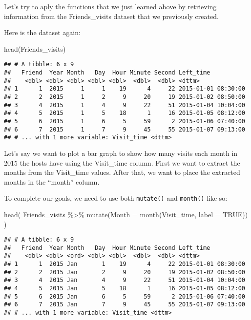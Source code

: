 \documentclass[
]{book}
\newenvironment{Shaded}{\begin{snugshade}}{\end{snugshade}}
\newcommand{\AttributeTok}[1]{\textcolor[rgb]{0.77,0.63,0.00}{#1}}
\newcommand{\ConstantTok}[1]{\textcolor[rgb]{0.00,0.00,0.00}{#1}}
\newcommand{\FunctionTok}[1]{\textcolor[rgb]{0.00,0.00,0.00}{#1}}
\newcommand{\NormalTok}[1]{#1}
\newcommand{\SpecialCharTok}[1]{\textcolor[rgb]{0.00,0.00,0.00}{#1}}
\begin{document}
Let's try to aply the functions that we just learned above by retrieving information from the Friends\_visits dataset that we previously created.

Here is the dataset again:

\begin{Shaded}
\begin{Highlighting}[]
\FunctionTok{head}\NormalTok{(Friends\_visits)}
\end{Highlighting}
\end{Shaded}

\begin{verbatim}
## # A tibble: 6 x 9
##   Friend  Year Month   Day  Hour Minute Second Left_time          
##    <dbl> <dbl> <dbl> <dbl> <dbl>  <dbl>  <dbl> <dttm>             
## 1      1  2015     1     1    19      4     22 2015-01-01 08:30:00
## 2      2  2015     1     2     9     20     19 2015-01-02 08:50:00
## 3      4  2015     1     4     9     22     51 2015-01-04 10:04:00
## 4      5  2015     1     5    18      1     16 2015-01-05 08:12:00
## 5      6  2015     1     6     5     59      2 2015-01-06 07:40:00
## 6      7  2015     1     7     9     45     55 2015-01-07 09:13:00
## # ... with 1 more variable: Visit_time <dttm>
\end{verbatim}

Let's say we want to plot a bar graph to show how many visits each month in 2015 the hosts have using the Visit\_time column. First we want to extract the months from the Visit\_time values. After that, we want to place the extracted months in the ``month'' column.

To complete our goals, we need to use both \texttt{mutate()} and \texttt{month()} like so:

\begin{Shaded}
\begin{Highlighting}[]
\FunctionTok{head}\NormalTok{(}
\NormalTok{Friends\_visits }\SpecialCharTok{\%\textgreater{}\%} 
    \FunctionTok{mutate}\NormalTok{(}\AttributeTok{Month =} \FunctionTok{month}\NormalTok{(Visit\_time, }\AttributeTok{label =} \ConstantTok{TRUE}\NormalTok{))}
\NormalTok{    )}
\end{Highlighting}
\end{Shaded}

\begin{verbatim}
## # A tibble: 6 x 9
##   Friend  Year Month   Day  Hour Minute Second Left_time          
##    <dbl> <dbl> <ord> <dbl> <dbl>  <dbl>  <dbl> <dttm>             
## 1      1  2015 Jan       1    19      4     22 2015-01-01 08:30:00
## 2      2  2015 Jan       2     9     20     19 2015-01-02 08:50:00
## 3      4  2015 Jan       4     9     22     51 2015-01-04 10:04:00
## 4      5  2015 Jan       5    18      1     16 2015-01-05 08:12:00
## 5      6  2015 Jan       6     5     59      2 2015-01-06 07:40:00
## 6      7  2015 Jan       7     9     45     55 2015-01-07 09:13:00
## # ... with 1 more variable: Visit_time <dttm>
\end{verbatim}
\end{document}
